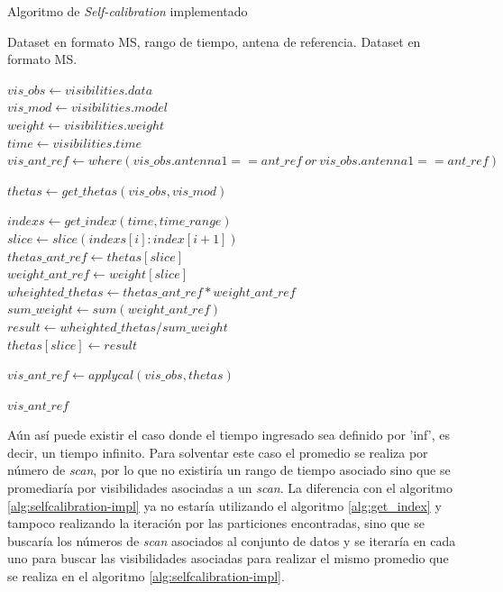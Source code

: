 \begin{algorithm}[!ht]
	\caption{Algoritmo de \textit{Self-calibration} implementado}
	\label{alg:selfcalibration-impl}
	\begin{algorithmic}[1]
	\REQUIRE Dataset en formato MS, rango de tiempo, antena de referencia.
	\ENSURE Dataset en formato MS.
	
	    \STATE $vis\_obs \gets visibilities.data$ \\
	    \STATE $vis\_mod \gets visibilities.model$ \\ 
        \STATE $weight \gets visibilities.weight$ \\
        \STATE $time \gets visibilities.time$ \\ 

        \STATE $vis\_ant\_ref \gets where(vis\_obs.antenna1 == ant\_ref\ or\ vis\_obs.antenna1 == ant\_ref)$

        \STATE $thetas \gets get\_thetas(vis\_obs, vis\_mod)$
        
        \STATE $indexs \gets get\_index(time, time\_range)$
            \STATE $slice \gets slice(indexs[i]:index[i+1])$\\

            \STATE $thetas\_ant\_ref \gets thetas[slice]$\\
            \STATE $weight\_ant\_ref \gets weight[slice]$\\

            \STATE $wheighted\_thetas \gets thetas\_ant\_ref * weight\_ant\_ref$ \\ 
            \STATE $sum\_weight \gets sum(weight\_ant\_ref)$\\
            \STATE $result \gets wheighted\_thetas / sum\_weight$\\

            \STATE $thetas[slice] \gets result$\\
        \ENDFOR 
            
        \STATE $vis\_ant\_ref \gets applycal(vis\_obs,thetas)$\\
	 
	\ENDFOR
	
	\RETURN $vis\_ant\_ref$
	
	\end{algorithmic}
\end{algorithm}

Aún así puede existir el caso donde el tiempo ingresado sea definido por 'inf', es decir, un tiempo infinito. Para solventar este caso el promedio se realiza por número de \textit{scan}, por lo que no existiría un rango de tiempo asociado sino que se promediaría por visibilidades asociadas a un \textit{scan}. La diferencia con el algoritmo \ref{alg:selfcalibration-impl} ya no estaría utilizando el algoritmo \ref{alg:get_index} y tampoco realizando la iteración por las particiones encontradas, sino que se buscaría los números de \textit{scan} asociados al conjunto de datos y se iteraría en cada uno para buscar las visibilidades asociadas para realizar el mismo promedio que se realiza en el algoritmo \ref{alg:selfcalibration-impl}.

